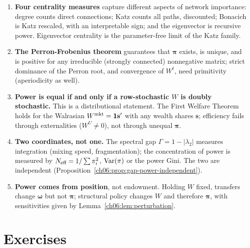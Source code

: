 \documentclass[../structural_economics_book.tex]{subfiles}
\begin{document}
\begin{enumerate}
\item \textbf{Four centrality measures} capture different aspects of network importance: degree counts direct connections; Katz counts all paths, discounted; Bonacich is Katz rescaled, with an interpretable sign; and the eigenvector is recursive power. Eigenvector centrality is the parameter-free limit of the Katz family.

\item \textbf{The Perron-Frobenius theorem} guarantees that $\boldsymbol{\pi}$ exists, is unique, and is positive for any irreducible (strongly connected) nonnegative matrix; strict dominance of the Perron root, and convergence of $W^t$, need primitivity (aperiodicity as well).

\item \textbf{Power is equal if and only if a row-stochastic $W$ is doubly stochastic.} This is a distributional statement. The First Welfare Theorem holds for the Walrasian $W^{\text{mkt}} = \mathbf{1}\mathbf{s}'$ with any wealth shares $\mathbf{s}$; efficiency fails through externalities ($W^U \neq 0$), not through unequal $\boldsymbol{\pi}$.

\item \textbf{Two coordinates, not one.} The spectral gap $\Gamma = 1 - |\lambda_2|$ measures integration (mixing speed, fragmentation); the concentration of power is measured by $N_{\text{eff}} = 1/\sum\pi_i^2$, $\operatorname{Var}(\pi)$ or the power Gini. The two are independent (Proposition~\ref{ch06:prop:gap-power-independent}).

\item \textbf{Power comes from position}, not endowment. Holding $W$ fixed, transfers change $\boldsymbol{\omega}$ but not $\boldsymbol{\pi}$; structural policy changes $W$ and therefore $\boldsymbol{\pi}$, with sensitivities given by Lemma~\ref{ch06:lem:perturbation}.
\end{enumerate}


\section{Exercises}
\label{ch06:sec:exercises}
\end{document}
